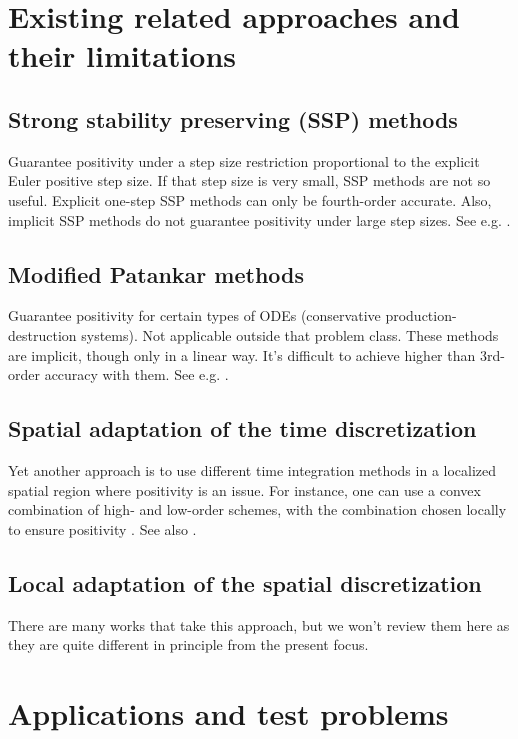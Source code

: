 \documentclass{article}
\begin{document}
\section{Existing related approaches and their limitations}
\subsection{Strong stability preserving (SSP) methods}
Guarantee positivity under a step size restriction proportional
to the explicit Euler positive step size.  If that step size
is very small, SSP methods are not so useful.  Explicit
one-step SSP methods can only be fourth-order accurate.  Also,
implicit SSP methods do not guarantee positivity under
large step sizes.  See e.g. \cite{gottlieb2009high,gottlieb2011strong}.

\subsection{Modified Patankar methods}
Guarantee positivity for certain types of ODEs
(conservative production-destruction systems).
Not applicable outside that problem class.  These methods
are implicit, though only in a linear way.
It's difficult to achieve higher than 3rd-order
accuracy with them.  See e.g. \cite{ortleb2017patankar,kopecz2018unconditionally}.


\subsection{Spatial adaptation of the time discretization}
Yet another approach is to use different time integration methods
in a localized spatial region where positivity is an issue.
For instance, one can use a convex combination of high-
and low-order schemes, with the combination chosen locally
to ensure positivity \cite{duraisamy2003concepts}.
See also \cite{ketcheson2013spatially,duraisamy2007implicit}.

\subsection{Local adaptation of the spatial discretization}
There are many works that take this approach, but we won't
review them here as they are quite different in principle
from the present focus.

\section{Applications and test problems}
\end{document}
